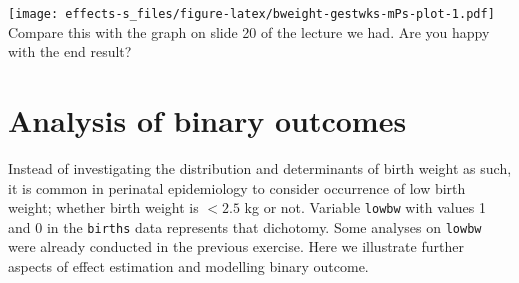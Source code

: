 \documentclass[
]{book}
\newenvironment{Shaded}{\begin{snugshade}}{\end{snugshade}}
\newcommand{\AttributeTok}[1]{\textcolor[rgb]{0.13,0.29,0.53}{#1}}
\newcommand{\CommentTok}[1]{\textcolor[rgb]{0.56,0.35,0.01}{\textit{#1}}}
\newcommand{\DecValTok}[1]{\textcolor[rgb]{0.00,0.00,0.81}{#1}}
\newcommand{\FloatTok}[1]{\textcolor[rgb]{0.00,0.00,0.81}{#1}}
\newcommand{\FunctionTok}[1]{\textcolor[rgb]{0.13,0.29,0.53}{\textbf{#1}}}
\newcommand{\NormalTok}[1]{#1}
\newcommand{\OtherTok}[1]{\textcolor[rgb]{0.56,0.35,0.01}{#1}}
\newcommand{\SpecialCharTok}[1]{\textcolor[rgb]{0.81,0.36,0.00}{\textbf{#1}}}
\begin{document}
\begin{Shaded}
\end{Shaded}

\texttt{[image: effects-s\_files/figure-latex/bweight-gestwks-mPs-plot-1.pdf]}
Compare this with the graph on slide 20 of the lecture we had.
Are you happy with the end result?

\section{Analysis of binary outcomes}\label{analysis-of-binary-outcomes}

Instead of investigating the distribution and determinants
of birth weight as such, it is common in perinatal
epidemiology to consider
occurrence of low birth weight; whether birth weight is
\(< 2.5\) kg or not. Variable \texttt{lowbw} with values 1 and 0
in the \texttt{births} data represents that dichotomy.
Some analyses on \texttt{lowbw} were already conducted
in the previous exercise. Here we illustrate further
aspects of effect estimation
and modelling binary outcome.
\end{document}
